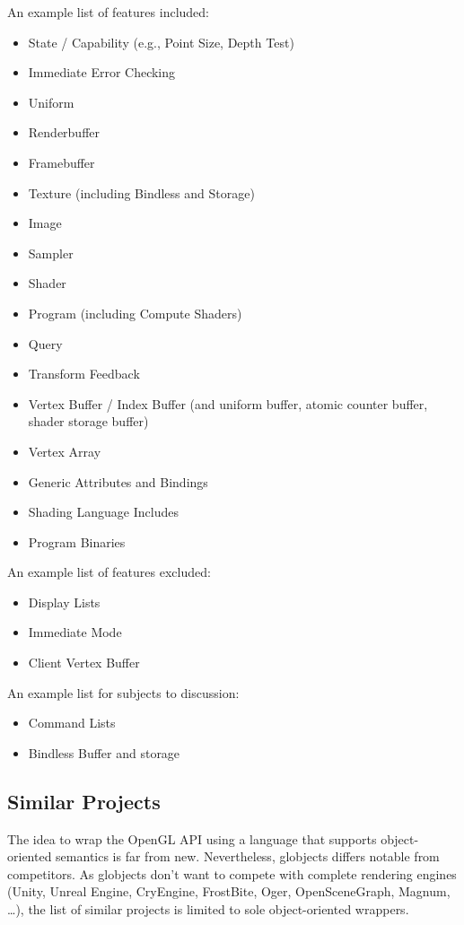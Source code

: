 \documentclass{article}
\begin{document}
An example list of features included:
\begin{itemize}
	\item State / Capability (e.g., Point Size, Depth Test)
	\item Immediate Error Checking
	\item Uniform
	\item Renderbuffer
	\item Framebuffer
	\item Texture (including Bindless and Storage)
	\item Image
	\item Sampler
	\item Shader
	\item Program (including Compute Shaders)
	\item Query
	\item Transform Feedback
	\item Vertex Buffer / Index Buffer (and uniform buffer, atomic counter buffer, shader storage buffer)
	\item Vertex Array
	\item Generic Attributes and Bindings
	\item Shading Language Includes
	\item Program Binaries
\end{itemize}

\noindent An example list of features excluded:
\begin{itemize}
	\item Display Lists
	\item Immediate Mode
	\item Client Vertex Buffer
\end{itemize}

\noindent An example list for subjects to discussion:
\begin{itemize}
	\item Command Lists
	\item Bindless Buffer and storage
\end{itemize}

\subsection{Similar Projects}

The idea to wrap the OpenGL API using a language that supports object-oriented semantics is far from new. Nevertheless, globjects differs notable from competitors.
As globjects don't want to compete with complete rendering engines (Unity, Unreal Engine, CryEngine, FrostBite, Oger, OpenSceneGraph, Magnum, \dots), the list of similar projects is limited to sole object-oriented wrappers.
\end{document}

